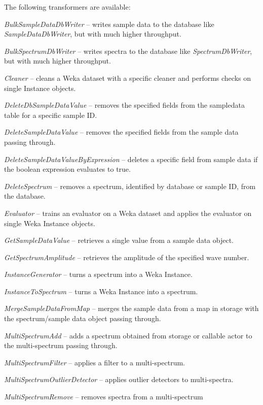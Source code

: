 \documentclass[a4paper]{book}
\begin{document}
The following transformers are available:
\begin{tight_itemize}
  \item \textit{BulkSampleDataDbWriter} -- writes sample data to the database like \textit{SampleDataDbWriter}, but
  with much higher throughput.
  \item \textit{BulkSpectrumDbWriter} -- writes spectra to the database like \textit{SpectrumDbWriter}, but
  with much higher throughput.
  \item \textit{Cleaner} -- cleans a Weka dataset with a specific cleaner
  and performs checks on single Instance objects.
  \item \textit{DeleteDbSampleDataValue} -- removes the specified fields
  from the sampledata table for a specific sample ID.
  \item \textit{DeleteSampleDataValue} -- removes the specified fields
  from the sample data passing through.
  \item \textit{DeleteSampleDataValueByExpression} -- deletes a specific
  field from sample data if the boolean expression evaluates to true.
  \item \textit{DeleteSpectrum} -- removes a spectrum, identified by
  database or sample ID, from the database.
  \item \textit{Evaluator} -- trains an evaluator on a Weka dataset and
  applies the evaluator on single Weka Instance objects.
  \item \textit{GetSampleDataValue} -- retrieves a single value from a
  sample data object.
  \item \textit{GetSpectrumAmplitude} -- retrieves the amplitude of the
  specified wave number.
  \item \textit{InstanceGenerator} -- turns a spectrum into a Weka Instance.
  \item \textit{InstanceToSpectrum} -- turns a Weka Instance into a spectrum.
  \item \textit{MergeSampleDataFromMap} -- merges the sample data from a map in storage
  with the spectrum/sample data object passing through.
  \item \textit{MultiSpectrumAdd} -- adds a spectrum obtained from storage or
  callable actor to the multi-spectrum passing through.
  \item \textit{MultiSpectrumFilter} -- applies a filter to a multi-spectrum.
  \item \textit{MultiSpectrumOutlierDetector} -- applies outlier detectors
  to multi-spectra.
  \item \textit{MultiSpectrumRemove} -- removes spectra from a multi-spectrum

\end{tight_itemize}
\end{document}
